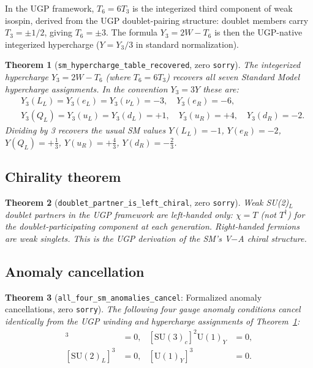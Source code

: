 \documentclass[12pt]{article}
\newtheorem{theorem}{Theorem}[section]
\theoremstyle{remark}
\newcommand{\YY}{Y_3}
\newcommand{\TT}{T_6}
\newcommand{\sorry}{\texttt{sorry}}
\newcommand{\lean}[1]{\texttt{#1}}
\begin{document}
In the UGP framework, $T_6 = 6T_3$ is the integerized third component of
weak isospin, derived from the UGP doublet-pairing structure: doublet members
carry $T_3 = \pm 1/2$, giving $T_6 = \pm 3$.  The formula $\YY = 2W - \TT$
is then the UGP-native integerized hypercharge ($Y = \YY/3$ in standard
normalization).

\begin{theorem}[\lean{sm\_hypercharge\_table\_recovered}, zero \sorry]
\label{thm:hypercharge}
The integerized hypercharge $\YY = 2W - \TT$ (where $\TT = 6T_3$) recovers all
seven Standard Model hypercharge assignments.  In the convention $Y_3 = 3Y$
these are:
\begin{align*}
  &Y_3(L_L) = Y_3(e_L) = Y_3(\nu_L) = -3,\quad Y_3(e_R) = -6,\\
  &Y_3(Q_L) = Y_3(u_L) = Y_3(d_L) = +1,\quad Y_3(u_R) = +4,\quad Y_3(d_R) = -2.
\end{align*}
Dividing by 3 recovers the usual SM values
$Y(L_L) = -1$, $Y(e_R) = -2$, $Y(Q_L) = +\tfrac{1}{3}$,
$Y(u_R) = +\tfrac{4}{3}$, $Y(d_R) = -\tfrac{2}{3}$.
\end{theorem}

\subsection{Chirality theorem}

\begin{theorem}[\lean{doublet\_partner\_is\_left\_chiral}, zero \sorry]
Weak SU(2)$_L$ doublet partners in the UGP framework are left-handed only:
$\chi = T$ (not $T^\dagger$) for the doublet-participating component at each
generation.  Right-handed fermions are weak singlets.  This is the UGP
derivation of the SM's V$-$A chiral structure.
\end{theorem}

\subsection{Anomaly cancellation}

\begin{theorem}[\lean{all\_four\_sm\_anomalies\_cancel}: Formalized anomaly cancellations, zero \sorry]
The following four gauge anomaly conditions cancel identically from the UGP
winding and hypercharge assignments of Theorem~\ref{thm:hypercharge}:
\begin{align}
  [\mathrm{SU}(3)_c]^3 &= 0, &
  [\mathrm{SU}(3)_c]^2 \mathrm{U}(1)_Y &= 0, \label{eq:anom1}\\
  [\mathrm{SU}(2)_L]^3 &= 0, &
  [\mathrm{U}(1)_Y]^3 &= 0. \label{eq:anom2}
\end{align}
\end{theorem}
\end{document}
